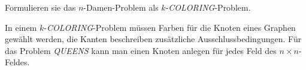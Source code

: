 Formulieren sie das $n$-Damen-Problem als $k$-\textit{COLORING}-Problem.

\begin{loesung}
In einem $k$-\textit{COLORING}-Problem müssen Farben für die Knoten
eines Graphen gewählt werden, die Kanten beschreiben zusätzliche
Ausschlussbedingungen.
Für das Problem \textit{QUEENS} kann man einen Knoten anlegen für
jedes Feld des $n\times n$-Feldes.

\end{loesung}

